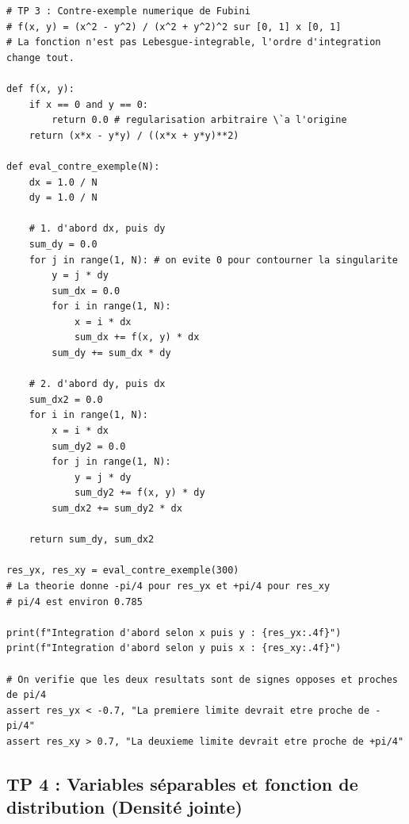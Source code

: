 \documentclass[11pt,a4paper]{article}
\begin{document}
\begin{lstlisting}
# TP 3 : Contre-exemple numerique de Fubini
# f(x, y) = (x^2 - y^2) / (x^2 + y^2)^2 sur [0, 1] x [0, 1]
# La fonction n'est pas Lebesgue-integrable, l'ordre d'integration change tout.

def f(x, y):
    if x == 0 and y == 0:
        return 0.0 # regularisation arbitraire \`a l'origine
    return (x*x - y*y) / ((x*x + y*y)**2)

def eval_contre_exemple(N):
    dx = 1.0 / N
    dy = 1.0 / N

    # 1. d'abord dx, puis dy
    sum_dy = 0.0
    for j in range(1, N): # on evite 0 pour contourner la singularite
        y = j * dy
        sum_dx = 0.0
        for i in range(1, N):
            x = i * dx
            sum_dx += f(x, y) * dx
        sum_dy += sum_dx * dy

    # 2. d'abord dy, puis dx
    sum_dx2 = 0.0
    for i in range(1, N):
        x = i * dx
        sum_dy2 = 0.0
        for j in range(1, N):
            y = j * dy
            sum_dy2 += f(x, y) * dy
        sum_dx2 += sum_dy2 * dx

    return sum_dy, sum_dx2

res_yx, res_xy = eval_contre_exemple(300)
# La theorie donne -pi/4 pour res_yx et +pi/4 pour res_xy
# pi/4 est environ 0.785

print(f"Integration d'abord selon x puis y : {res_yx:.4f}")
print(f"Integration d'abord selon y puis x : {res_xy:.4f}")

# On verifie que les deux resultats sont de signes opposes et proches de pi/4
assert res_yx < -0.7, "La premiere limite devrait etre proche de -pi/4"
assert res_xy > 0.7, "La deuxieme limite devrait etre proche de +pi/4"
\end{lstlisting}


\subsection*{TP 4 : Variables séparables et fonction de distribution (Densité jointe)}
\end{document}
